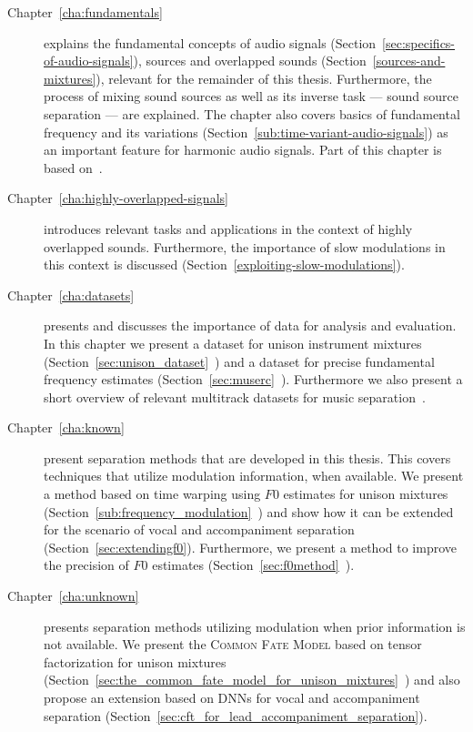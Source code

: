 \begin{description}
  \item[Chapter~\ref{cha:fundamentals}] explains the fundamental concepts of audio signals (Section~\ref{sec:specifics-of-audio-signals}), sources and overlapped sounds (Section~\ref{sources-and-mixtures}), relevant for the remainder of this thesis.
  Furthermore, the process of mixing sound sources as well as its inverse task --- sound source separation --- are explained.
  The chapter also covers basics of fundamental frequency and its variations (Section~\ref{sub:time-variant-audio-signals}) as an important feature for harmonic audio signals.
  Part of this chapter is based on~\cite{rafii18}.
  \item[Chapter~\ref{cha:highly-overlapped-signals}] introduces relevant tasks and applications in the context of highly overlapped sounds.
  Furthermore, the importance of slow modulations in this context is discussed (Section~\ref{exploiting-slow-modulations}).
  \item[Chapter~\ref{cha:datasets}] presents and discusses the importance of data for analysis and evaluation.
  In this chapter we present a dataset for unison instrument mixtures (Section~\ref{sec:unison_dataset}~\cite{oss_unison, stoeter14}) and a dataset for precise fundamental frequency estimates (Section~\ref{sec:muserc}~\cite{oss_muserc, stoeter15acm}). Furthermore we also present a short overview of relevant multitrack datasets for music separation~\cite{liutkus17, rafii18}.
  \item[Chapter~\ref{cha:known}] present separation methods that are developed in this thesis. This covers techniques that utilize modulation information, when available. We present a method based on time warping using $F0$ estimates for unison mixtures (Section~\ref{sub:frequency_modulation}~\cite{stoeter14}) and show how it can be extended for the scenario of vocal and accompaniment separation (Section~\ref{sec:extendingf0}). Furthermore, we present a method to improve the precision of $F0$ estimates (Section~\ref{sec:f0method}~\cite{stoeter15icassp}).
  \item[Chapter~\ref{cha:unknown}] presents separation methods utilizing modulation when prior information is not available. We present the \textsc{Common Fate Model} based on tensor factorization for unison mixtures (Section~\ref{sec:the_common_fate_model_for_unison_mixtures}~\cite{stoeter16}) and also propose an extension based on DNNs for vocal and accompaniment separation (Section~\ref{sec:cft_for_lead_accompaniment_separation}).

\end{description}
